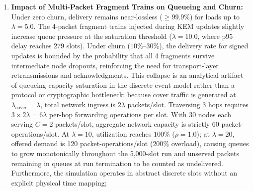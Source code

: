 \documentclass[11pt,a4paper]{article}
\theoremstyle{remark}
\theoremstyle{plain}
\begin{document}
\begin{enumerate}
        \paragraph{Mitigating Burst Fingerprints.}
        To eliminate this traffic-analysis vector in production deployments, several countermeasures may be deployed:
        (i)~\emph{dummy burst injection}, wherein nodes periodically inject dummy 4-packet trains at randomized (e.g., Poisson-distributed) intervals independent of ratchet updates;
        (ii)~\emph{uniform train padding}, wherein routine conversational messages are padded with dummy Sphinx packets to constant multi-packet trains ($k=4$); or
        (iii)~\emph{dribble fragmentation}, wherein KEM public keys, ciphertexts, and signatures are streamed incrementally across consecutive single-packet conversational messages (similar to the chunked streaming in SPQR \cite{signal_spqr}), trading a wider post-compromise exposure window for a smooth, single-packet traffic profile.
  \item \textbf{Impact of Multi-Packet Fragment Trains on Queueing and Churn:} Under zero churn, delivery
        remains near-lossless ($\ge 99.9\%$) for loads up to $\lambda = 5.0$.  The 4-packet fragment trains
        injected during KEM updates slightly increase queue pressure at the saturation threshold ($\lambda = 10.0$,
        where p95 delay reaches 279 slots).  Under churn ($10\%$--$30\%$), the delivery rate for signed updates
        is bounded by the probability that all 4 fragments survive intermediate node dropouts, reinforcing the need
        for transport-layer retransmissions and acknowledgments.
        This collapse is an analytical artifact of queueing capacity saturation in the discrete-event model
        rather than a protocol or cryptographic bottleneck: because cover traffic is generated at
        $\lambda_{\mathrm{cover}} = \lambda$, total network ingress is $2\lambda$ packets/slot.
        Traversing 3 hops requires $3 \times 2\lambda = 6\lambda$ per-hop forwarding operations per slot.
        With 30 nodes each serving $C = 2$ packets/slot, aggregate network capacity is strictly 60 packet-operations/slot.
        At $\lambda = 10$, utilization reaches $100\%$ ($\rho = 1.0$); at $\lambda = 20$, offered demand is 120
        packet-operations/slot ($200\%$ overload), causing queues to grow monotonically throughout the 5{,}000-slot run
        and unserved packets remaining in queues at run termination to be counted as undelivered.
        Furthermore, the simulation operates in abstract discrete slots without an explicit physical time mapping;

\end{enumerate}
\end{document}
